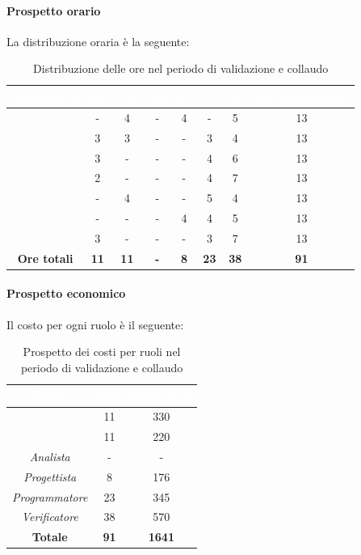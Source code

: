 \paragraph*{Prospetto orario}
La distribuzione oraria è la seguente:
\begin{table}[H]
	\begin{center}
		\begin{tabular}{ |c c c c c c c c| }
			\rowcolor{darkblue} 
			\textcolor{white}{\textbf{Nominativo}} & \textcolor{white}{\textbf{Re}} & \textcolor{white}{\textbf{Am}} & \textcolor{white}{\textbf{An}} & \textcolor{white}{\textbf{Pt}} & \textcolor{white}{\textbf{Pr}} & \textcolor{white}{\textbf{Ve}} & \textcolor{white}{\textbf{Ore Complessive}} \\ \hline
			\BL 	& -  	& 4  	& - 	& 4 	& - 	& 5 	& 13 \\ \hline
			\FF 	& 3  	& 3  	& - 	& - 	& 3 	& 4  	& 13 \\ \hline
			\MM 	& 3 	& - 	& - 	& - 	& 4 	& 6 	& 13 \\ \hline
			\PC 	& 2 	& -  	& - 	& - 	& 4 	& 7 	& 13 \\ \hline
			\TG 	& -  	& 4 	& - 	& - 	& 5 	& 4 	& 13 \\ \hline
			\TL 	& -  	& - 	& - 	& 4 	& 4 	& 5 	& 13 \\ \hline
			\VD 	& 3  	& -  	& - 	& - 	& 3 	& 7  	& 13 \\ \hline
			\textbf{Ore totali} & \textbf{11} & \textbf{11} & \textbf{-} & \textbf{8} & \textbf{23} & \textbf{38} & \textbf{91} \\ \hline
		\end{tabular}
		\caption{Distribuzione delle ore nel periodo di validazione e collaudo}
	\end{center}
\end{table}
\paragraph*{Prospetto economico}
Il costo per ogni ruolo è il seguente:
\begin{table}[H]
	\begin{center}
		\begin{tabular}{ |c c c| }
			\rowcolor{darkblue} 
			\textcolor{white}{\textbf{Ruolo}} & \textcolor{white}{\textbf{Ore}} & \textcolor{white}{\textbf{Costo in €}}\\ \hline
			{\Responsabile} 			& 11 	& 330 \\ \hline
			{\Amministratore}		 	& 11 	& 220 \\ \hline
			\textit{Analista} 			& - 	& - \\ \hline
			\textit{Progettista} 		& 8 	& 176 \\ \hline
			\textit{Programmatore}  	& 23 	& 345 \\ \hline
			\textit{Verificatore} 		& 38 	& 570 \\ \hline
			\textbf{Totale} & \textbf{91} & \textbf{1641} \\ \hline
		\end{tabular}
		\caption{Prospetto dei costi per ruoli nel periodo di validazione e collaudo}
	\end{center}
\end{table}
